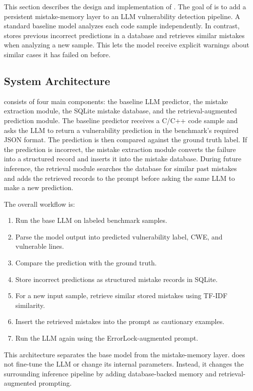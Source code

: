 \label{sec:overview}

This section describes the design and implementation of \system. The goal of \system is to add a persistent mistake-memory layer to an LLM vulnerability detection pipeline. A standard baseline model analyzes each code sample independently. In contrast, \system stores previous incorrect predictions in a database and retrieves similar mistakes when analyzing a new sample. This lets the model receive explicit warnings about similar cases it has failed on before.

\subsection{System Architecture}

\system consists of four main components: the baseline LLM predictor, the mistake extraction module, the SQLite mistake database, and the retrieval-augmented prediction module. The baseline predictor receives a C/C++ code sample and asks the LLM to return a vulnerability prediction in the benchmark's required JSON format. The prediction is then compared against the ground truth label. If the prediction is incorrect, the mistake extraction module converts the failure into a structured record and inserts it into the mistake database. During future inference, the retrieval module searches the database for similar past mistakes and adds the retrieved records to the prompt before asking the same LLM to make a new prediction.

The overall workflow is:

\begin{enumerate}
    \item Run the base LLM on labeled benchmark samples.
    \item Parse the model output into predicted vulnerability label, CWE, and vulnerable lines.
    \item Compare the prediction with the ground truth.
    \item Store incorrect predictions as structured mistake records in SQLite.
    \item For a new input sample, retrieve similar stored mistakes using TF-IDF similarity.
    \item Insert the retrieved mistakes into the prompt as cautionary examples.
    \item Run the LLM again using the ErrorLock-augmented prompt.
\end{enumerate}

This architecture separates the base model from the mistake-memory layer. \system does not fine-tune the LLM or change its internal parameters. Instead, it changes the surrounding inference pipeline by adding database-backed memory and retrieval-augmented prompting.

